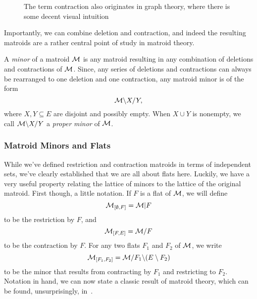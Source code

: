 \documentclass[12pt,oneside]{../../sfsuthesis}
\begin{document}
\begin{figure}[H]
\begin{subfigure}[t]{.45\textwidth}
    \end{subfigure}
    \caption{The term contraction also originates in graph theory, where there is some decent visual intuition}\label{fig:contractionMatroid}

\end{figure}

Importantly, we can combine deletion and contraction, and indeed the resulting matroids are a rather central point of study in matroid theory.

\begin{definition}\th\label{def:minor}
    A \emph{minor} of a matroid \( \mathcal{M} \) is any matroid resulting in any combination of deletions and contractions of \( \mathcal{M} \).
    Since, any series of deletions and contractions can always be rearranged to one deletion and one contraction, any matroid minor is of the form
    \[
        \mathcal{M} \backslash X / Y,
    \]
    where \( X, Y \subseteq E \) are disjoint and possibly empty.
    When \( X \cup Y \) is nonempty, we call \( \mathcal{M} \backslash X / Y \) a \emph{proper minor} of \( \mathcal{M} \).
\end{definition}

\subsubsection{Matroid Minors and Flats}

While we've defined restriction and contraction matroids in terms of independent sets, we've clearly established that we are all about flats here.
Luckily, we have a very useful property relating the lattice of minors to the lattice of the original matroid.
First though, a little notation.
If \( F \) is a flat of \( \mathcal{M} \), we will define
\[
    \mathcal{M}_{[\emptyset, F]} = \mathcal{M}|F
\]
to be the restriction by \( F \), and
\[
    \mathcal{M}_{[F, E]} = \mathcal{M}  / F
\]
to be the contraction by \( F \).
For any two flats \( F_1 \) and \( F_2 \) of \( \mathcal{M} \), we write
\[
    \mathcal{M}_{[F_1, F_2]} = \mathcal{M} / F_1 \backslash (E \setminus F_2)
\]
to be the minor that results from contracting by \( F_1 \) and restricting to \( F_2 \).
Notation in hand, we can now state a classic result of matroid theory, which can be found, unsurprisingly, in~\cite[p.~116]{oxleyMatroidTheory2011}.
\end{document}
